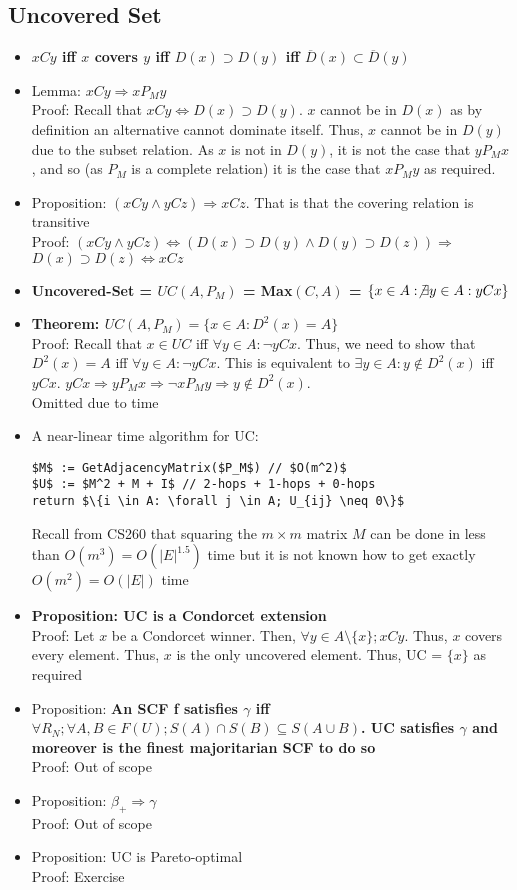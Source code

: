 \documentclass[20pt,a4paper,landscape]{extarticle}
\begin{document}
\begin{flushleft}
\subsection{Uncovered Set}
\begin{itemize}
\item \textbf{$xCy$ iff $x$ covers $y$ iff $D(x) \supset D(y)$ iff $\overline{D}(x) \subset\overline{D}(y)$}
\item Lemma: $xCy \Rightarrow xP_My$\\
Proof: Recall that $xCy \Leftrightarrow D(x) \supset D(y)$. $x$ cannot be in $D(x)$ as by definition an alternative cannot dominate itself. Thus, $x$ cannot be in $D(y)$ due to the subset relation. As $x$ is not in $D(y)$, it is not the case that $yP_Mx$, and so (as $P_M$ is a complete relation) it is the case that $xP_My$ as required.
\item Proposition: $(xCy \land yCz) \Rightarrow xCz$. That is that the covering relation is transitive\\
Proof: $(xCy \land yCz) \Leftrightarrow (D(x) \supset D(y) \land D(y) \supset D(z))\Rightarrow$\\
$D(x) \supset D(z) \Leftrightarrow xCz$
\item \textbf{Uncovered-Set = $UC(A, P_M)$ = Max$(C, A)$ = $\{x \in A: \not \exists y \in A: yCx\}$}
\item \textbf{Theorem: $UC(A, P_M) = \{x \in A: D^2(x) = A\}$}\\
Proof: Recall that $x \in UC$ iff $\forall y \in A: \neg yCx$. Thus, we need to show that $D^2(x) = A$ iff $\forall y \in A: \neg yCx$. This is equivalent to $\exists y \in A: y \notin D^2(x)$ iff $yCx$. $yCx \Rightarrow yP_Mx \Rightarrow \neg xP_My \Rightarrow y \notin D^2(x)$.\\
Omitted due to time
\item A near-linear time algorithm for UC:
\begin{lstlisting}
$M$ := GetAdjacencyMatrix($P_M$) // $O(m^2)$
$U$ := $M^2 + M + I$ // 2-hops + 1-hops + 0-hops
return $\{i \in A: \forall j \in A; U_{ij} \neq 0\}$
\end{lstlisting}
Recall from CS260 that squaring the $m\times m$ matrix $M$ can be done in less than $O(m^3) = O(|E|^{1.5})$ time but it is not known how to get exactly $O(m^2) = O(|E|)$ time
\clearpage
\item \textbf{Proposition: UC is a Condorcet extension}\\
Proof: Let $x$ be a Condorcet winner. Then, $\forall y \in A \setminus \{x\}; xCy$. Thus, $x$ covers every element. Thus, $x$ is the only uncovered element. Thus, UC = $\{x\}$ as required
\item Proposition: \textbf{An SCF f satisfies $\gamma$ iff $\forall R_N; \forall A, B \in F(U); S(A) \cap S(B) \subseteq S(A \cup B)$. UC satisfies $\gamma$ and moreover is the finest majoritarian SCF to do so}\\
Proof: Out of scope
\item Proposition: $\beta_+ \Rightarrow \gamma$\\
Proof: Out of scope
\item Proposition: UC is Pareto-optimal\\
Proof: Exercise

\end{itemize}
\end{flushleft}
\end{document}
